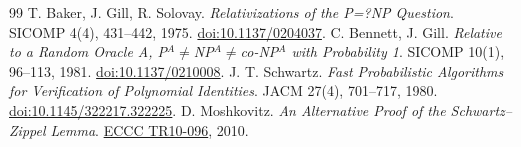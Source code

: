 \documentclass[11pt]{article}
\begin{document}
\begin{thebibliography}{99}
T. Baker, J. Gill, R. Solovay. \emph{Relativizations of the P=?NP Question}. SICOMP 4(4), 431--442, 1975. \href{https://doi.org/10.1137/0204037}{doi:10.1137/0204037}.
C. Bennett, J. Gill. \emph{Relative to a Random Oracle A, P$^A\ne$NP$^A\ne$co-NP$^A$ with Probability 1}. SICOMP 10(1), 96--113, 1981. \href{https://epubs.siam.org/doi/10.1137/0210008}{doi:10.1137/0210008}.
J. T. Schwartz. \emph{Fast Probabilistic Algorithms for Verification of Polynomial Identities}. JACM 27(4), 701--717, 1980. \href{https://doi.org/10.1145/322217.322225}{doi:10.1145/322217.322225}.
D. Moshkovitz. \emph{An Alternative Proof of the Schwartz--Zippel Lemma}. \href{https://eccc.weizmann.ac.il/report/2010/096/}{ECCC TR10-096}, 2010.
\end{thebibliography}
\end{document}
